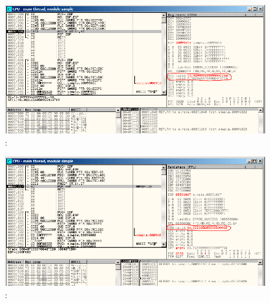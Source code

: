 \begin{figure}[H]
\centering
\includegraphics[scale=\FigScale]{patterns/12_FPU/1_simple/olly4.png}
\caption{\olly: \FMUL {}}
\label{fig:FPU_simple_olly_4}
\end{figure}

\begin{figure}[H]
\centering
\includegraphics[scale=\FigScale]{patterns/12_FPU/1_simple/olly5.png}
\caption{\olly: \FADDP {}}
\label{fig:FPU_simple_olly_5}
\end{figure}
